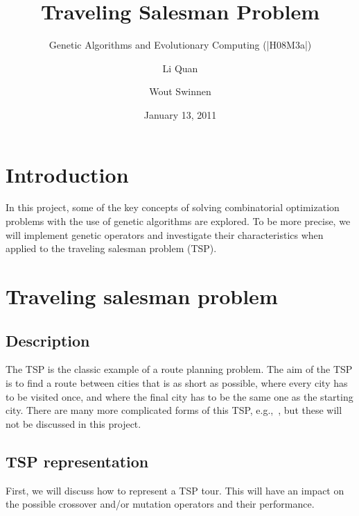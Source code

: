 \documentclass[a4paper,english,11pt,]{scrartcl}
\title{Traveling Salesman Problem}
\subtitle{Genetic Algorithms and Evolutionary Computing (|H08M3a|)}
\author{Li Quan\and Wout Swinnen}
\date{January 13, 2011}
\begin{document}
\maketitle


\small{
\tableofcontents
\listoffigures
\listoftables
}


\clearpage

\section{Introduction}
In this project, some of the key concepts of solving combinatorial optimization problems with the use of genetic algorithms are explored. To be more precise, we will implement genetic operators and investigate their characteristics when applied to the traveling salesman problem (TSP). 


\section{Traveling salesman problem}
\subsection{Description}
The TSP is the classic example of a route planning problem. The aim of the TSP is to find a route between cities that is as short as possible, where every city has to be visited once, and where the final city has to be the same one as the starting city. There are many more complicated forms of this TSP, e.g.,~\cite{affenzeller2009genetic,multiple_tsp,gutin2002traveling}, but these will not be discussed in this project.
% 

\subsection{TSP representation}
First, we will discuss how to represent a TSP tour. This will have an impact on the possible crossover and/or mutation operators and their performance.
\end{document}
